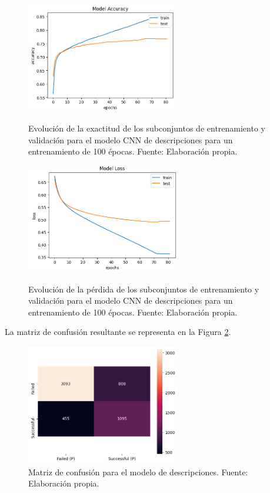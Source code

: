 \begin{figure}[htbp]
	\begin{center}
		\includegraphics[width=0.60\textwidth]{4/figures/description_model_accuracy.png}
		\caption{Evolución de la exactitud de los subconjuntos de entrenamiento y validación para el modelo CNN de descripciones para un entrenamiento de 100 épocas. Fuente: Elaboración propia.}
		\label{5:fig5}
		\includegraphics[width=0.60\textwidth]{4/figures/description_model_loss.png}
		\caption{Evolución de la pérdida de los subconjuntos de entrenamiento y validación para el modelo CNN de descripciones para un entrenamiento de 100 épocas. Fuente: Elaboración propia.}
		\label{5:fig6}
	\end{center}
\end{figure}

La matriz de confusión resultante se representa en la Figura \ref{5:fig7}.

\begin{figure}[!ht]
	\begin{center}
		\includegraphics[width=0.60\textwidth]{4/figures/description_confusion_matrix.png}
		\caption{Matriz de confusión para el modelo de descripciones. Fuente: Elaboración propia.}
		\label{5:fig7}
	\end{center}
\end{figure}

